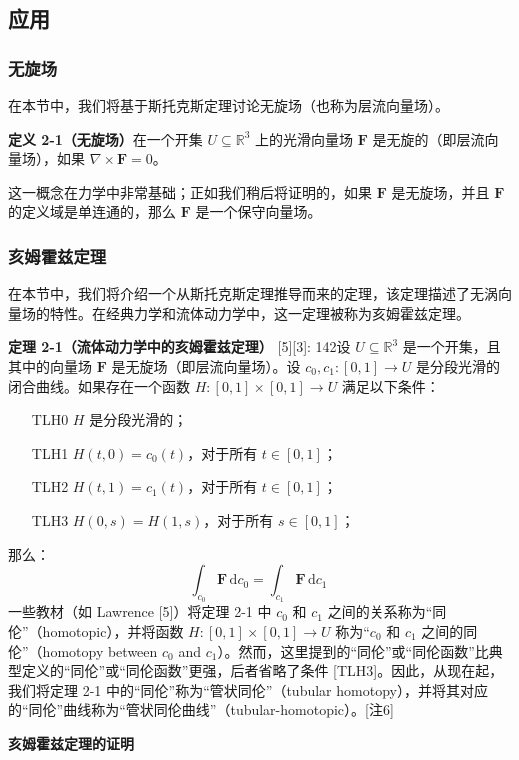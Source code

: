 \subsection{应用}
\subsubsection{无旋场}

在本节中，我们将基于斯托克斯定理讨论无旋场（也称为层流向量场）。

\textbf{定义 2-1（无旋场）}在一个开集 \(U \subseteq \mathbb{R}^3\) 上的光滑向量场 \(\mathbf{F}\) 是无旋的（即层流向量场），如果 \(\nabla \times \mathbf{F} = 0\)。

这一概念在力学中非常基础；正如我们稍后将证明的，如果 \(\mathbf{F}\) 是无旋场，并且 \(\mathbf{F}\) 的定义域是单连通的，那么 \(\mathbf{F}\) 是一个保守向量场。
\subsubsection{亥姆霍兹定理}
在本节中，我们将介绍一个从斯托克斯定理推导而来的定理，该定理描述了无涡向量场的特性。在经典力学和流体动力学中，这一定理被称为亥姆霍兹定理。

\textbf{定理 2-1（流体动力学中的亥姆霍兹定理）} [5][3]: 142设 \(U \subseteq \mathbb{R}^3\) 是一个开集，且其中的向量场 \(\mathbf{F}\) 是无旋场（即层流向量场）。设 \(c_0, c_1: [0, 1] \to U\) 是分段光滑的闭合曲线。如果存在一个函数 \(H: [0, 1] \times [0, 1] \to U\) 满足以下条件：
\begin{itemize}
\item [TLH0] \(H\) 是分段光滑的；
\item [TLH1] \(H(t, 0) = c_0(t)\)，对于所有 \(t \in [0, 1]\)；
\item [TLH2] \(H(t, 1) = c_1(t)\)，对于所有 \(t \in [0, 1]\)；
\item [TLH3] \(H(0, s) = H(1, s)\)，对于所有 \(s \in [0, 1]\)；
\end{itemize}
那么：
\[
\int_{c_0} \mathbf{F} \, \mathrm{d}c_0 = \int_{c_1} \mathbf{F} \, \mathrm{d}c_1~
\]
一些教材（如 Lawrence [5]）将定理 2-1 中 \(c_0\) 和 \(c_1\) 之间的关系称为“同伦”（homotopic），并将函数 \(H: [0, 1] \times [0, 1] \to U\) 称为“\(c_0\) 和 \(c_1\) 之间的同伦”（homotopy between \(c_0\) and \(c_1\)）。然而，这里提到的“同伦”或“同伦函数”比典型定义的“同伦”或“同伦函数”更强，后者省略了条件 [TLH3]。因此，从现在起，我们将定理 2-1 中的“同伦”称为“管状同伦”（tubular homotopy），并将其对应的“同伦”曲线称为“管状同伦曲线”（tubular-homotopic）。[注6]

\textbf{亥姆霍兹定理的证明}

